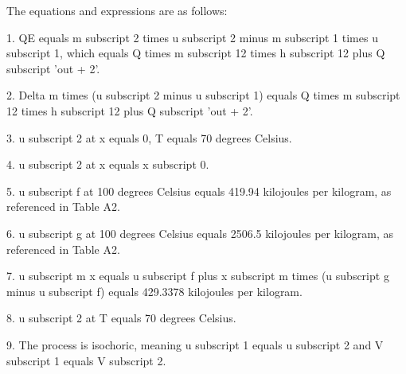 The equations and expressions are as follows:

1. QE equals m subscript 2 times u subscript 2 minus m subscript 1 times u subscript 1, which equals Q times m subscript 12 times h subscript 12 plus Q subscript 'out + 2'.

2. Delta m times (u subscript 2 minus u subscript 1) equals Q times m subscript 12 times h subscript 12 plus Q subscript 'out + 2'.

3. u subscript 2 at x equals 0, T equals 70 degrees Celsius.

4. u subscript 2 at x equals x subscript 0.

5. u subscript f at 100 degrees Celsius equals 419.94 kilojoules per kilogram, as referenced in Table A2.

6. u subscript g at 100 degrees Celsius equals 2506.5 kilojoules per kilogram, as referenced in Table A2.

7. u subscript m x equals u subscript f plus x subscript m times (u subscript g minus u subscript f) equals 429.3378 kilojoules per kilogram.

8. u subscript 2 at T equals 70 degrees Celsius.

9. The process is isochoric, meaning u subscript 1 equals u subscript 2 and V subscript 1 equals V subscript 2.